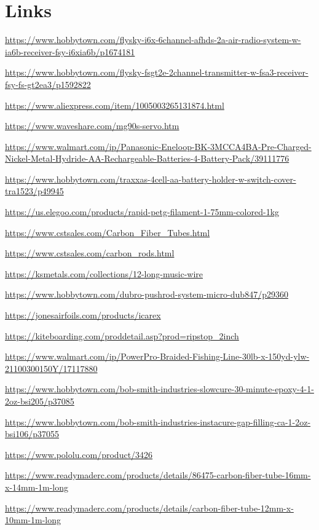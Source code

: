 \documentclass[11pt]{article}
\begin{document}
\section*{Links}
{\small
\begin{enumerate}[label={[\arabic*]}]
\item \url{https://www.hobbytown.com/flysky-i6x-6channel-afhds-2a-air-radio-system-w-ia6b-receiver-fsy-i6xia6b/p1674181}
\item \url{https://www.hobbytown.com/flysky-fsgt2e-2channel-transmitter-w-fsa3-receiver-fsy-fs-gt2ea3/p1592822}
\item \url{https://www.aliexpress.com/item/1005003265131874.html}
\item \url{https://www.waveshare.com/mg90s-servo.htm}
\item \url{https://www.walmart.com/ip/Panasonic-Eneloop-BK-3MCCA4BA-Pre-Charged-Nickel-Metal-Hydride-AA-Rechargeable-Batteries-4-Battery-Pack/39111776}
\item \url{https://www.hobbytown.com/traxxas-4cell-aa-battery-holder-w-switch-cover-tra1523/p49945}
\item \url{https://us.elegoo.com/products/rapid-petg-filament-1-75mm-colored-1kg}
\item \url{https://www.cstsales.com/Carbon_Fiber_Tubes.html}
\item \url{https://www.cstsales.com/carbon_rods.html}
\item \url{https://ksmetals.com/collections/12-long-music-wire}
\item \url{https://www.hobbytown.com/dubro-pushrod-system-micro-dub847/p29360}
\item \url{https://jonesairfoils.com/products/icarex}
\item \url{https://kiteboarding.com/proddetail.asp?prod=ripstop_2inch}
\item \url{https://www.walmart.com/ip/PowerPro-Braided-Fishing-Line-30lb-x-150yd-ylw-21100300150Y/17117880}
\item \url{https://www.hobbytown.com/bob-smith-industries-slowcure-30-minute-epoxy-4-1-2oz-bsi205/p37085}
\item \url{https://www.hobbytown.com/bob-smith-industries-instacure-gap-filling-ca-1-2oz-bsi106/p37055}
\item \url{https://www.pololu.com/product/3426}
\item \url{https://www.readymaderc.com/products/details/86475-carbon-fiber-tube-16mm-x-14mm-1m-long}
\item \url{https://www.readymaderc.com/products/details/carbon-fiber-tube-12mm-x-10mm-1m-long}

\end{enumerate}}
\end{document}

